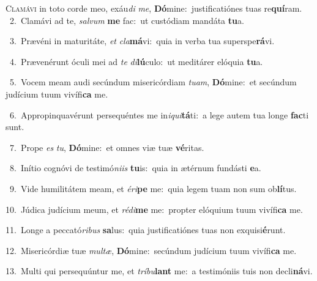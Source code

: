 \lettrine{\initial\textcolor{\initialcolor}{C}}{lamávi} in toto corde meo, exáu\textit{di} \textit{me}\-, \textbf{Dó}\-mine:~\star justificatiónes tuas re\-\textbf{quí}\-ram.\\
{\numbfont\textcolor{\numbcolor}{~2.}}~Clamávi ad te, \textit{sal}\-\textit{vum} \textbf{me} fac:~\star ut custódiam mandáta \textbf{tu}\-a.\par
{\numbfont\textcolor{\numbcolor}{~3.}}~Prævéni in maturitáte, \textit{et} \textit{cla}\-\textbf{má}vi:~\star quia in verba tua superspe\-\textbf{rá}\-vi.\par
{\numbfont\textcolor{\numbcolor}{~4.}}~Prævenérunt óculi mei ad \textit{te} \textit{di}\-\textbf{lú}culo:~\star ut meditárer elóquia \textbf{tu}\-a.\par
{\numbfont\textcolor{\numbcolor}{~5.}}~Vocem meam audi secúndum misericórdiam \textit{tu}\-\textit{am}, \textbf{Dó}\-mine:~\star et secúndum judícium tuum vivífi\textbf{ca} me.\par
{\numbfont\textcolor{\numbcolor}{~6.}}~Appropinquavérunt persequéntes me in\-\textit{i}\-\textit{qui}\textbf{tá}ti:~\star a lege autem tua longe \textbf{fac}\-ti sunt.\par
{\numbfont\textcolor{\numbcolor}{~7.}}~Prope \textit{es} \textit{tu}\-, \textbf{Dó}\-mine:~\star et omnes viæ tuæ \textbf{vé}\-ritas.\par
{\numbfont\textcolor{\numbcolor}{~8.}}~Inítio cognóvi de testimó\-\textit{ni}\-\textit{is} \textbf{tu}\-is:~\star quia in ætérnum fundásti \textbf{e}\-a.\par
{\numbfont\textcolor{\numbcolor}{~9.}}~Vide humilitátem meam, et \textit{é}\-\textit{ri}\textbf{pe} me:~\star quia legem tuam non sum ob\-\textbf{lí}\-tus.\par
{\numbfont\textcolor{\numbcolor}{10.}}~Júdica judícium meum, et \textit{réd}\-\textit{i}\textbf{me} me:~\star propter elóquium tuum vivífi\textbf{ca} me.\par
{\numbfont\textcolor{\numbcolor}{11.}}~Longe a peccató\-\textit{ri}\-\textit{bus} \textbf{sa}\-lus:~\star quia justificatiónes tuas non exquisi\-\textbf{é}\-runt.\par
{\numbfont\textcolor{\numbcolor}{12.}}~Misericórdiæ tuæ \textit{mul}\-\textit{tæ}, \textbf{Dó}\-mine:~\star secúndum judícium tuum vivífi\textbf{ca} me.\par
{\numbfont\textcolor{\numbcolor}{13.}}~Multi qui persequúntur me, et \textit{trí}\-\textit{bu}\textbf{lant} me:~\star a testimóniis tuis non decli\-\textbf{ná}\-vi.\par
